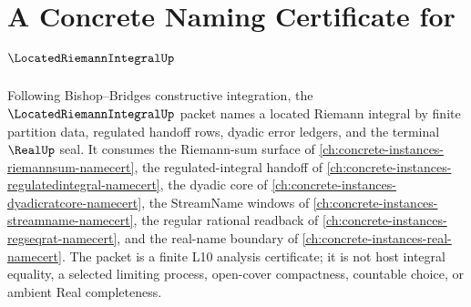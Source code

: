 \chapter{A Concrete Naming Certificate for $\LocatedRiemannIntegralUp$}
\label{ch:concrete-instances-located-riemann-integral-namecert}

Following Bishop--Bridges constructive integration, the $\LocatedRiemannIntegralUp$ packet names a located Riemann integral by finite partition data, regulated handoff rows, dyadic error ledgers, and the terminal $\RealUp$ seal. It consumes the Riemann-sum surface of \autoref{ch:concrete-instances-riemannsum-namecert}, the regulated-integral handoff of \autoref{ch:concrete-instances-regulatedintegral-namecert}, the dyadic core of \autoref{ch:concrete-instances-dyadicratcore-namecert}, the StreamName windows of \autoref{ch:concrete-instances-streamname-namecert}, the regular rational readback of \autoref{ch:concrete-instances-regseqrat-namecert}, and the real-name boundary of \autoref{ch:concrete-instances-real-namecert}. The packet is a finite L10 analysis certificate; it is not host integral equality, a selected limiting process, open-cover compactness, countable choice, or ambient Real completeness.

